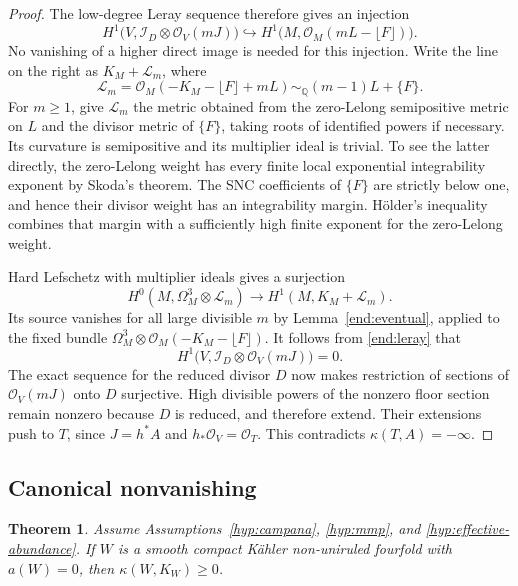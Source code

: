 \documentclass[11pt,letterpaper]{article}
\newcommand{\Q}{\mathbb{Q}}
\newcommand{\OO}{\mathcal{O}}
\newtheorem{theorem}{Theorem}[section]
\theoremstyle{definition}
\theoremstyle{remark}
\begin{document}
\begin{proof}
The low-degree Leray sequence therefore gives an injection
\begin{equation}\label{end:leray}
 H^1\bigl(V,\mathcal I_D\otimes\OO_V(mJ)\bigr)
 \hookrightarrow
 H^1\bigl(M,\OO_M(mL-\lfloor F\rfloor)\bigr).
\end{equation}
No vanishing of a higher direct image is needed for this injection.
Write the line on the right as \(K_M+\mathcal L_m\), where
\begin{equation}\label{end:hl-line}
 \mathcal L_m=
 \OO_M(-K_M-\lfloor F\rfloor+mL)
 \sim_{\Q}(m-1)L+\{F\}.
\end{equation}
For \(m\ge1\), give \(\mathcal L_m\) the metric obtained from
the zero-Lelong semipositive metric on \(L\) and the divisor metric
of \(\{F\}\), taking roots of identified powers if necessary.
Its curvature is semipositive and its multiplier ideal is trivial.
To see the latter directly, the zero-Lelong weight has every finite
local exponential integrability exponent by Skoda's theorem. The
SNC coefficients of \(\{F\}\) are strictly below one, and hence
their divisor weight has an integrability margin. H\"older's
inequality combines that margin with a sufficiently high finite
exponent for the zero-Lelong weight.

Hard Lefschetz with multiplier ideals
\cite[Theorem~0.1]{DPSHardLefschetz} gives a surjection
\[
 H^0(M,\Omega_M^3\otimes\mathcal L_m)
   \longrightarrow H^1(M,K_M+\mathcal L_m).
\]
Its source vanishes for all large divisible \(m\) by
Lemma~\ref{end:eventual}, applied to the fixed bundle
\(\Omega_M^3\otimes\OO_M(-K_M-\lfloor F\rfloor)\).
It follows from \eqref{end:leray} that
\[
 H^1\bigl(V,\mathcal I_D\otimes\OO_V(mJ)\bigr)=0.
\]
The exact sequence for the reduced divisor \(D\) now makes
restriction of sections of \(\OO_V(mJ)\) onto \(D\)
surjective. High divisible powers of the nonzero floor section
remain nonzero because \(D\) is reduced, and therefore extend.
Their extensions push to \(T\), since \(J=h^*A\) and
\(h_*\OO_V=\OO_T\). This contradicts
\(\kappa(T,A)=-\infty\).
\end{proof}

\subsection{Canonical nonvanishing}

\begin{theorem}\label{end:canonical}
Assume Assumptions~\ref{hyp:campana}, \ref{hyp:mmp}, and
\ref{hyp:effective-abundance}. If \(W\) is a smooth compact
K\"ahler non-uniruled fourfold with \(a(W)=0\), then
\(\kappa(W,K_W)\ge0\).
\end{theorem}
\end{document}
